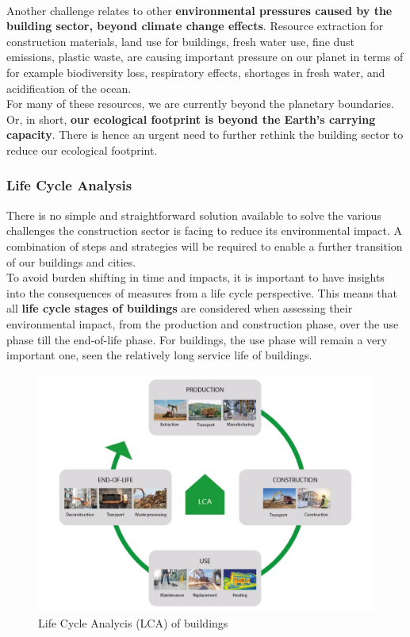 \documentclass[../summary.tex]{subfiles}
\begin{document}
	\ \\
	Another challenge relates to other \textbf{environmental pressures caused by the building sector, beyond climate change effects}. Resource extraction for construction materials, land use for buildings, fresh water use, fine dust emissions, plastic waste, are causing important pressure on our planet in terms of for example biodiversity loss, respiratory effects, shortages in fresh water, and acidification of the ocean. 
	\\
	For many of these resources, we are currently beyond the planetary boundaries. Or, in short, \textbf{our ecological footprint is beyond the Earth’s carrying capacity}. There is hence an urgent need to further rethink the building sector to reduce our ecological footprint. 
	
	\subsubsection{Life Cycle Analysis}
	
	There is no simple and straightforward solution available to solve the various challenges the construction sector is facing to reduce its environmental impact. A combination of steps and strategies will be required to enable a further transition of our buildings and cities.
	\\
	To avoid burden shifting in time and impacts, it is important to have insights into the consequences of measures from a life cycle perspective. This means that all \textbf{life cycle stages of buildings} are considered when assessing their environmental impact, from the production and construction phase, over the use phase till the end-of-life phase. For buildings, the use phase will remain a very important one, seen the relatively long service life of buildings.
	
	\begin{figure}[H]
		\centering
		\includegraphics[width=0.69\linewidth]{../images/8-LCA}
		\caption{Life Cycle Analycis (LCA) of buildings}
		\label{fig:8-lca}
	\end{figure}
	
\end{document}
